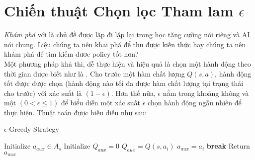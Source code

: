 \section{Chiến thuật Chọn lọc Tham lam $\epsilon$}\label{e-greedy}
\textit{Khám phá} với là chủ đề được lặp đi lặp lại trong học tăng cường nói riêng và AI nói chung. Liệu chúng ta nên khai phá để thu được kiến thức hay chúng ta nên khám phá để tìm kiếm đươc policy tốt hơn?\\
Một phương pháp khả thi, dễ thực hiện và hiệu quả là chọn một hành động theo thời gian được biết như là . Cho trước một hàm chất lượng $Q(s,a)$, hành động tốt được được chọn (hành động nào tối đa được hàm chất lượng tại trạng thái cho trước) với xác suất là $(1-\epsilon)$. Hơn thế nữa, $\epsilon$ nằm trong khoảng không và một $(0<\epsilon\le 1)$ để biểu diễn một xác suất $\epsilon$ chọn hành động ngẫu nhiên để thực hiện. Thuật toán được biếu diễu như sau\cite{RLSuttonBook}:
\begin{algorithm}[H]
\caption{$\epsilon$-Greedy Strategy}
\begin{algorithmic}[1]
\State Initialize $a_{aux}\in A_s$
\Else
\State Initialize $Q_{aux}=0$
\State $Q_{aux} = Q(s,a_i)$
\State $a_{aux}=a_i$
\State \textbf{break}
\EndIf
\EndFor
\EndIf
\State Return $a_{aux}$
\EndProcedure
\end{algorithmic}
\end{algorithm}
